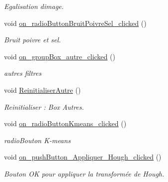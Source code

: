 \begin{DoxyCompactItemize}
\begin{DoxyCompactList}\small\item\em Egalisation d\textquotesingle{}image. \end{DoxyCompactList}\item 
\mbox{\label{classMainWindow_afe756729e53a981bfd2e25f0551c378b}} 
void \hyperlink{classMainWindow_afe756729e53a981bfd2e25f0551c378b}{on\+\_\+radio\+Button\+Bruit\+Poivre\+Sel\+\_\+clicked} ()
\begin{DoxyCompactList}\small\item\em Bruit poivre et sel. \end{DoxyCompactList}\item 
\mbox{\label{classMainWindow_a908bfb9e085d25a116ad56ec8e976f5d}} 
void \hyperlink{classMainWindow_a908bfb9e085d25a116ad56ec8e976f5d}{on\+\_\+group\+Box\+\_\+autre\+\_\+clicked} ()
\begin{DoxyCompactList}\small\item\em autres filtres \end{DoxyCompactList}\item 
\mbox{\label{classMainWindow_aa2fe1d15891827da32e14c28567fc66a}} 
void \hyperlink{classMainWindow_aa2fe1d15891827da32e14c28567fc66a}{Reinitialiser\+Autre} ()
\begin{DoxyCompactList}\small\item\em Reinitialiser \+: Box Autres. \end{DoxyCompactList}\item 
\mbox{\label{classMainWindow_a78ca3c2a493a26f99743a6833a35a6f7}} 
void \hyperlink{classMainWindow_a78ca3c2a493a26f99743a6833a35a6f7}{on\+\_\+radio\+Button\+Kmeans\+\_\+clicked} ()
\begin{DoxyCompactList}\small\item\em radio\+Bouton K-\/means \end{DoxyCompactList}\item 
\mbox{\label{classMainWindow_a471d6806c6dab1db759f5e4454455a05}} 
void \hyperlink{classMainWindow_a471d6806c6dab1db759f5e4454455a05}{on\+\_\+push\+Button\+\_\+\+Appliquer\+\_\+\+Hough\+\_\+clicked} ()
\begin{DoxyCompactList}\small\item\em Bouton OK pour appliquer la transformée de Hough. \end{DoxyCompactList}\item 

\end{DoxyCompactItemize}
